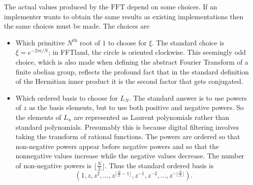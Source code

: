 \documentclass[12pt, letterpaper, oneside]{amsart}
\theoremstyle{definition}
\theoremstyle{plain}
\numberwithin{equation}{para}
\numberwithin{figure}{section}
\newcommand{\FFT}{\text{FFT}}
\renewcommand{\th}{\text{th}}
\begin{document}
The actual values produced by the $\FFT$ depend on some choices.  If an
implementer wants to obtain the same results as existing implementations
then the same choices must be made.  The choices are
\begin{itemize}
\setlength\itemsep{1em}

\item Which primitive $N^\th$ root of $1$ to choose for $\xi$.  The standard
choice is $\xi = e^{-2\pi i/N}$; in FFTland, the circle is oriented clockwise.
This seemingly odd choice, which is also made when defining the abstract Fourier
Transform of a finite abelian group, reflects the profound fact that in the
standard definition of the Hermitian inner product it is the second factor that
gets conjugated.

\item Which ordered basis to choose for $L_N$.  The standard answer is to use
powers of $z$ as the basis elements, but to use both positive and negative
powers.  So the elements of $L_n$ are represented as Laurent polynomials
rather than standard polynomials.  Presumably this is because digital filtering
involves taking the transform of rational functions.  The powers are ordered
so that non-negative powers appear before negative powers and so that the
nonnegative values increase while the negative values decrease. The number
of non-negative powers is $\lfloor \frac{N}{2}\rfloor$.  Thus the standard ordered
basis is
$$(1, z, z^2, \ldots, z^{\lfloor \frac{N}{2} - 1\rfloor}, z^{-1}, z^{-2},
\ldots, z^{-\lfloor \frac{N}{2}\rfloor}).$$
\end{itemize}
\end{document}

